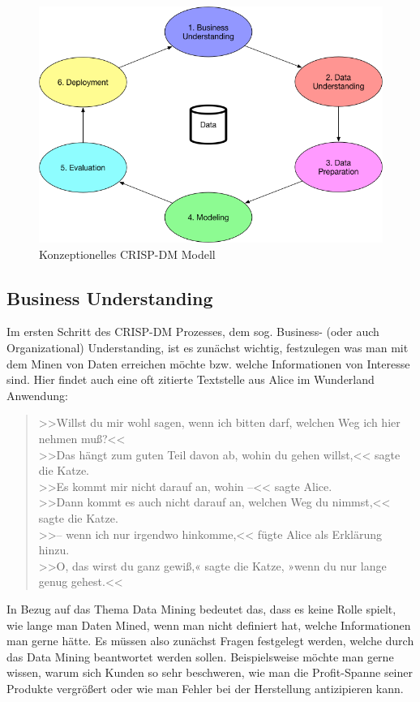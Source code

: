 \begin{figure}[htb]
	\includegraphics[width=\textwidth]{gfx/CRISP-DM_Model.png}
	\caption{Konzeptionelles CRISP-DM Modell}
	\label{fig:process:crispdm}
\end{figure}



\subsection{Business Understanding}
\label{sec:process:crispdm:bu}

Im ersten Schritt des CRISP-DM Prozesses, dem sog. Business- (oder auch Organizational) Understanding,
ist es zunächst wichtig, festzulegen was man mit dem Minen von Daten erreichen
möchte bzw. welche Informationen von Interesse sind. Hier findet auch eine oft
zitierte Textstelle aus Alice im Wunderland Anwendung:
\begin{quotation}
  >>Willst du mir wohl sagen, wenn ich bitten darf, welchen Weg ich hier nehmen muß?<< \\
  >>Das hängt zum guten Teil davon ab, wohin du gehen willst,<< sagte die Katze. \\
  >>Es kommt mir nicht darauf an, wohin –<< sagte Alice. \\
  >>Dann kommt es auch nicht darauf an, welchen Weg du nimmst,<< sagte die Katze. \\
  >>– wenn ich nur irgendwo hinkomme,<< fügte Alice als Erklärung hinzu. \\
  >>O, das wirst du ganz gewiß,« sagte die Katze, »wenn du nur lange genug gehest.<<
\end{quotation}
In Bezug auf das Thema Data Mining bedeutet das, dass es keine Rolle spielt, wie
lange man Daten Mined, wenn
man nicht definiert hat, welche Informationen man gerne hätte. Es müssen also
zunächst Fragen festgelegt werden, welche durch das Data Mining beantwortet
werden sollen. Beispielsweise möchte man gerne wissen, warum sich Kunden so sehr
beschweren, wie man die Profit-Spanne seiner Produkte vergrößert oder wie man
Fehler bei der Herstellung antizipieren kann.

